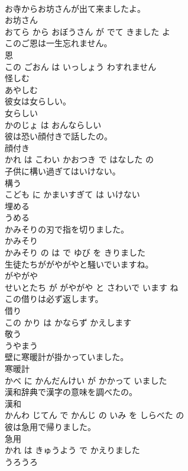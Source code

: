 \documentclass[8pt]{extreport}
\begin{document}
\begin{CJK}{UTF8}{min}
\\	お寺からお坊さんが出て来ましたよ。	
\\	お坊さん 
\\	おてら から おぼうさん が でて きました よ			
\\	このご恩は一生忘れません。	
\\	恩 
\\	この ごおん は いっしょう わすれません			
\\	怪しむ	
\\	あやしむ		
\\	彼女は女らしい。	
\\	女らしい 
\\	かのじょ は おんならしい			
\\	彼は恐い顔付きで話したの。	
\\	顔付き 
\\	かれ は こわい かおつき で はなした の			
\\	子供に構い過ぎてはいけない。	
\\	構う 
\\	こども に かまいすぎて は いけない			
\\	埋める	
\\	うめる		
\\	かみそりの刃で指を切りました。	
\\	かみそり 
\\	かみそり の は で ゆび を きりました			
\\	生徒たちががやがやと騒いでいますね。	
\\	がやがや 
\\	せいとたち が がやがや と さわいで います ね			
\\	この借りは必ず返します。	
\\	借り 
\\	この かり は かならず かえします			
\\	敬う	
\\	うやまう		
\\	壁に寒暖計が掛かっていました。	
\\	寒暖計 
\\	かべ に かんだんけい が かかって いました			
\\	漢和辞典で漢字の意味を調べたの。	
\\	漢和 
\\	かんわ じてん で かんじ の いみ を しらべた の			
\\	彼は急用で帰りました。	
\\	急用 
\\	かれ は きゅうよう で かえりました			
\\	うろうろ	

\end{CJK}
\end{document}
